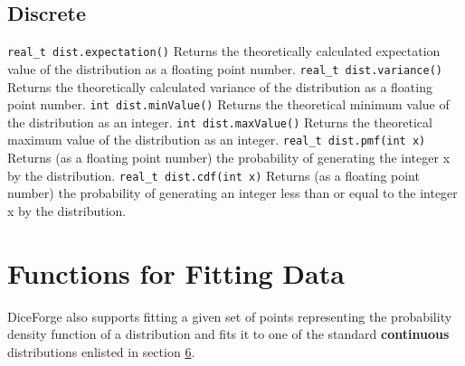 \documentclass[titlepage, 11pt]{article}
\newcommand{\code}[1]
{\colorbox{light-gray}{\texttt{#1}}}
\begin{document}
\subsection{Discrete}
\label{sec:3.2}
\code{real\_t dist.expectation()}
\newline
\newline
Returns the theoretically calculated expectation value of the distribution as a floating point number.
\newline
\newline
\code{real\_t dist.variance()}
\newline
\newline
Returns the theoretically calculated variance of the distribution as a floating point number.
\newline
\newline
\code{int dist.minValue()}
\newline
\newline
Returns the theoretical minimum value of the distribution as an integer.
\newline
\newline
\code{int dist.maxValue()}
\newline
\newline
Returns the theoretical maximum value of the distribution as an integer.
\newline
\newline
\code{real\_t dist.pmf(int x)}
\newline
\newline
Returns (as a floating point number) the probability of generating the integer x by the distribution.
\newline
\newline
\code{real\_t dist.cdf(int x)}
\newline
\newline
Returns (as a floating point number) the probability of generating an integer less than or equal to the integer x by the distribution.


\newpage
\section{Functions for Fitting Data}

DiceForge also supports fitting a given set of points representing the probability density function of a distribution and fits it to one of the standard \textbf{continuous} distributions enlisted in section \hyperref[sec:6]{6}.
\end{document}
